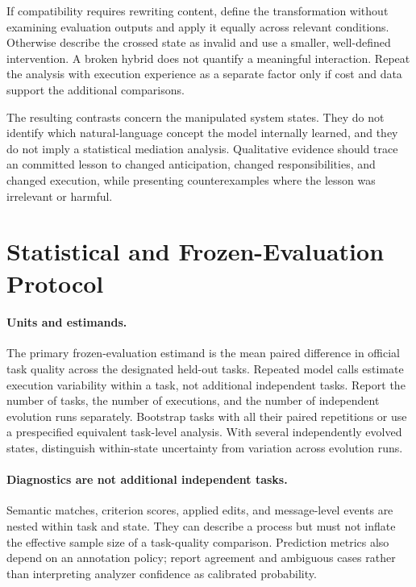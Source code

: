 If compatibility requires rewriting content, define the transformation without examining evaluation outputs and apply it equally across relevant conditions. Otherwise describe the crossed state as invalid and use a smaller, well-defined intervention. A broken hybrid does not quantify a meaningful interaction. Repeat the analysis with execution experience as a separate factor only if cost and data support the additional comparisons.

The resulting contrasts concern the manipulated system states. They do not identify which natural-language concept the model internally learned, and they do not imply a statistical mediation analysis. Qualitative evidence should trace an committed lesson to changed anticipation, changed responsibilities, and changed execution, while presenting counterexamples where the lesson was irrelevant or harmful.

\section{Statistical and Frozen-Evaluation Protocol}

\paragraph{Units and estimands.}
The primary frozen-evaluation estimand is the mean paired difference in official task quality across the designated held-out tasks. Repeated model calls estimate execution variability within a task, not additional independent tasks. Report the number of tasks, the number of executions, and the number of independent evolution runs separately. Bootstrap tasks with all their paired repetitions or use a prespecified equivalent task-level analysis. With several independently evolved states, distinguish within-state uncertainty from variation across evolution runs.

\paragraph{Diagnostics are not additional independent tasks.}
Semantic matches, criterion scores, applied edits, and message-level events are nested within task and state. They can describe a process but must not inflate the effective sample size of a task-quality comparison. Prediction metrics also depend on an annotation policy; report agreement and ambiguous cases rather than interpreting analyzer confidence as calibrated probability.

